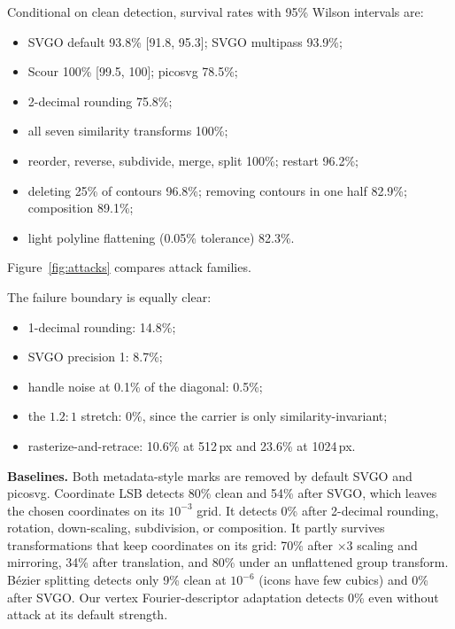 \documentclass[10pt,twocolumn]{article}
\begin{document}
Conditional on clean detection, survival rates with 95\% Wilson intervals are:
\begin{itemize}
\item SVGO default 93.8\% [91.8, 95.3]; SVGO multipass 93.9\%;
\item Scour 100\% [99.5, 100]; picosvg 78.5\%;
\item 2-decimal rounding 75.8\%;
\item all seven similarity transforms 100\%;
\item reorder, reverse, subdivide, merge, split 100\%; restart 96.2\%;
\item deleting 25\% of contours 96.8\%; removing contours in one half 82.9\%; composition 89.1\%;
\item light polyline flattening (0.05\% tolerance) 82.3\%.
\end{itemize}
Figure~\ref{fig:attacks} compares attack families.

The failure boundary is equally clear:
\begin{itemize}
\item 1-decimal rounding: 14.8\%;
\item SVGO precision 1: 8.7\%;
\item handle noise at 0.1\% of the diagonal: 0.5\%;
\item the $1.2{:}1$ stretch: 0\%, since the carrier is only similarity-invariant;
\item rasterize-and-retrace: 10.6\% at 512\,px and 23.6\% at 1024\,px.
\end{itemize}

\textbf{Baselines.} Both metadata-style marks are removed by default SVGO and picosvg. Coordinate LSB detects 80\% clean and 54\% after SVGO, which leaves the chosen coordinates on its $10^{-3}$ grid. It detects 0\% after 2-decimal rounding, rotation, down-scaling, subdivision, or composition. It partly survives transformations that keep coordinates on its grid: 70\% after $\times3$ scaling and mirroring, 34\% after translation, and 80\% under an unflattened group transform. Bézier splitting detects only 9\% clean at $10^{-6}$ (icons have few cubics) and 0\% after SVGO. Our vertex Fourier-descriptor adaptation detects 0\% even without attack at its default strength.
\end{document}
